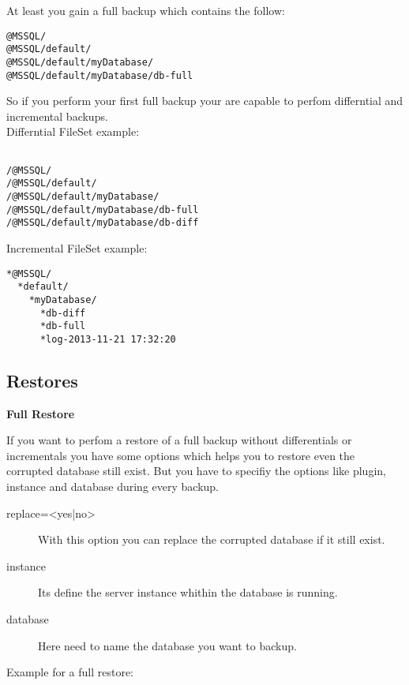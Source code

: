 At least you gain a full backup which contains the follow:

\footnotesize
\begin{verbatim}
@MSSQL/
@MSSQL/default/
@MSSQL/default/myDatabase/
@MSSQL/default/myDatabase/db-full
\end{verbatim}
\normalsize

So if you perform your first full backup your are capable to perfom differntial and incremental backups.\\

Differntial FileSet example:

\footnotesize
\begin{verbatim}

/@MSSQL/
/@MSSQL/default/
/@MSSQL/default/myDatabase/
/@MSSQL/default/myDatabase/db-full
/@MSSQL/default/myDatabase/db-diff
\end{verbatim}
\normalsize

Incremental FileSet example:

\footnotesize
\begin{verbatim}
*@MSSQL/
  *default/
    *myDatabase/
      *db-diff
      *db-full
      *log-2013-11-21 17:32:20
\end{verbatim}
\normalsize

\subsection{Restores}
\label{restoreways}

{\bf Full Restore}

If you want to perfom a restore of a full backup without differentials or incrementals you have some options which helps you to restore even the corrupted database still exist. But you have to specifiy the options like plugin, instance and database during every backup.

\begin{description}
  \item[replace=\textless yes|no\textgreater]
  With this option you can replace the corrupted database if it still exist.
  \item[instance]
  Its define the server instance whithin the database is running.
  \item[database]
  Here need to name the database you want to backup.
\end{description}

Example for a full restore:

